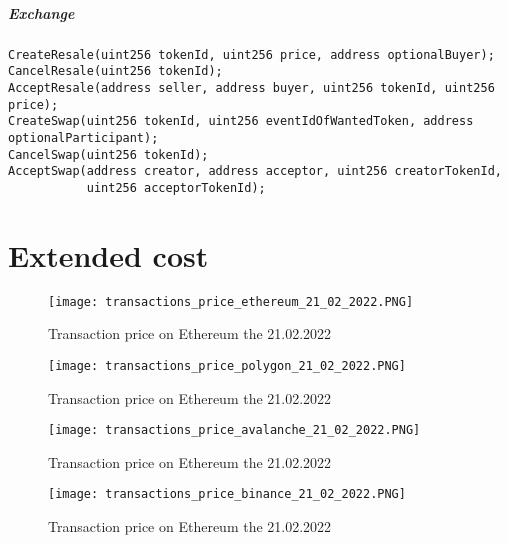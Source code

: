 \documentclass[a4paper,11pt,oneside]{report}
\begin{document}
\paragraph{Exchange}
\begin{verbatim}
CreateResale(uint256 tokenId, uint256 price, address optionalBuyer);
CancelResale(uint256 tokenId);
AcceptResale(address seller, address buyer, uint256 tokenId, uint256 price);
CreateSwap(uint256 tokenId, uint256 eventIdOfWantedToken, address optionalParticipant);
CancelSwap(uint256 tokenId);
AcceptSwap(address creator, address acceptor, uint256 creatorTokenId, 
           uint256 acceptorTokenId);
\end{verbatim}

\chapter{Extended cost}
\label{sec:appendix_b}

\begin{center}
\begin{figure}[h!] 
  \texttt{[image: transactions\_price\_ethereum\_21\_02\_2022.PNG]}
  \caption{Transaction price on Ethereum the 21.02.2022}
  \label{fig:transactions_price_ethereum_21_02_2022}
\end{figure}
\end{center}

\begin{center}
\begin{figure}[h!] 
  \texttt{[image: transactions\_price\_polygon\_21\_02\_2022.PNG]}
  \caption{Transaction price on Ethereum the 21.02.2022}
  \label{fig:transactions_price_polygon_21_02_2022}
\end{figure}
\end{center}

\begin{center}
\begin{figure}[h!] 
  \texttt{[image: transactions\_price\_avalanche\_21\_02\_2022.PNG]}
  \caption{Transaction price on Ethereum the 21.02.2022}
  \label{fig:transactions_price_avalanche_21_02_2022}
\end{figure}
\end{center}

\begin{center}
\begin{figure}[h!] 
  \texttt{[image: transactions\_price\_binance\_21\_02\_2022.PNG]}
  \caption{Transaction price on Ethereum the 21.02.2022}
  \label{fig:transactions_price_binance_21_02_2022}
\end{figure}
\end{center}
\end{document}
